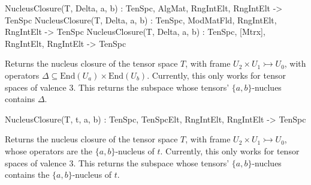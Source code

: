 \begin{intrinsics}
NucleusClosure(T, Delta, a, b) : TenSpc, AlgMat, RngIntElt, RngIntElt -> TenSpc
NucleusClosure(T, Delta, a, b) : TenSpc, ModMatFld, RngIntElt, RngIntElt -> TenSpc
NucleusClosure(T, Delta, a, b) : TenSpc, [Mtrx], RngIntElt, RngIntElt -> TenSpc
\end{intrinsics}

Returns the nucleus closure of the tensor space $T$, with frame $U_2\times U_1\rightarrowtail U_0$, with operators $\Delta\subseteq \text{End}(U_a)\times \text{End}(U_b)$.
Currently, this only works for tensor spaces of valence 3.
This returns the subspace whose tensors' $\{a,b\}$-nuclues contains $\Delta$.

\begin{intrinsics}
NucleusClosure(T, t, a, b) : TenSpc, TenSpcElt, RngIntElt, RngIntElt -> TenSpc
\end{intrinsics}

Returns the nucleus closure of the tensor space $T$, with frame $U_2\times U_1\rightarrowtail U_0$, whose operators are the $\{a,b\}$-nucleus of $t$.
Currently, this only works for tensor spaces of valence 3.
This returns the subspace whose tensors' $\{a,b\}$-nuclues contains the $\{a,b\}$-nucleus of $t$.

